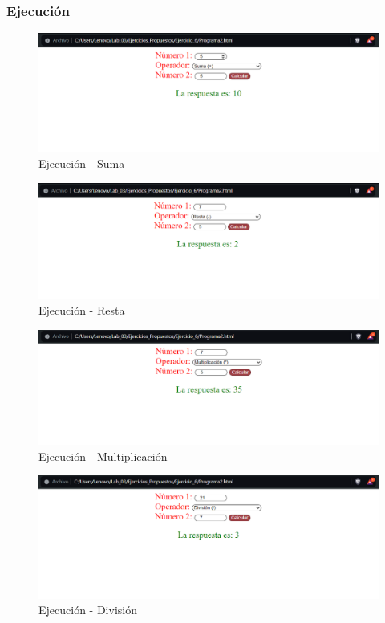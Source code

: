 \documentclass{article}
\begin{document}
	\subsubsection{Ejecución}
	\begin{figure}[H]
		\centering
		\includegraphics[width=1\textwidth,keepaspectratio]{img/suma.png}
		\caption{Ejecución - Suma}
	\end{figure}
	\begin{figure}[H]
		\centering
		\includegraphics[width=1\textwidth,keepaspectratio]{img/resta.png}
		\caption{Ejecución - Resta}
	\end{figure}
	\begin{figure}[H]
		\centering
		\includegraphics[width=1\textwidth,keepaspectratio]{img/multi.png}
		\caption{Ejecución - Multiplicación}
	\end{figure}
	\begin{figure}[H]
		\centering
		\includegraphics[width=1\textwidth,keepaspectratio]{img/div.png}
		\caption{Ejecución - División}
	\end{figure}
\end{document}
